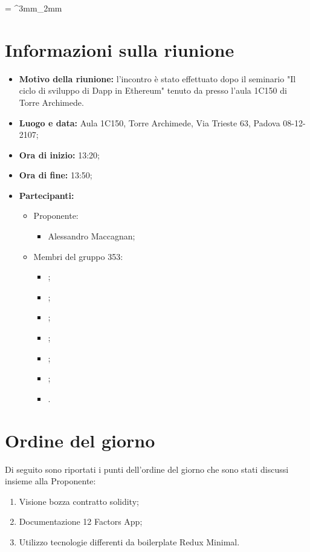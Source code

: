 \documentclass[VER-2018-01-09.tex]{subfiles}
\begin{document}
\tabulinesep = ^3mm_2mm
\chapter{Informazioni sulla riunione}
\begin{itemize}
	\item \textbf{Motivo della riunione:} l'incontro è stato effettuato dopo il seminario "Il ciclo di sviluppo di Dapp in Ethereum" tenuto da \Proponente{} presso l'aula 1C150 di Torre Archimede.

	\item \textbf{Luogo e data:} Aula 1C150, Torre Archimede, Via Trieste 63, Padova 08-12-2107;
	\item \textbf{Ora di inizio:} 13:20;
	\item \textbf{Ora di fine:} 13:50;
	\item \textbf{Partecipanti:}
	\begin{itemize}
		\item Proponente:
		\begin{itemize}
			\item Alessandro Maccagnan;
		\end{itemize}
		\item Membri del gruppo 353:
		\begin{itemize}
			\item \Davide;
			\item \Elena;
			\item \Gianluca;
			\item \Mirco;
			\item \Parwinder;
			\item \Riccardo;
			\item \Valentina.
		\end{itemize}
	\end{itemize}
\end{itemize}
\chapter{Ordine del giorno}	
Di seguito sono riportati i punti dell'ordine del giorno che sono stati discussi insieme alla Proponente:
\begin{enumerate}
	\item Visione bozza contratto solidity; 
	\item Documentazione 12 Factors App;
	\item Utilizzo tecnologie differenti da boilerplate Redux Minimal.
\end{enumerate}
\end{document}
